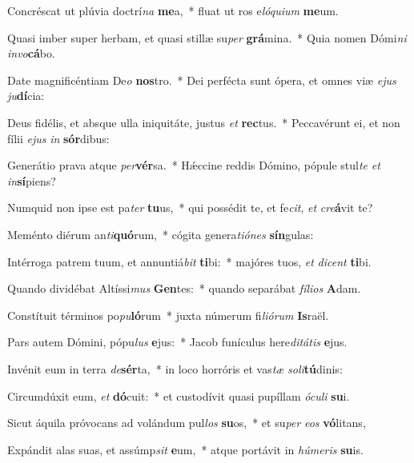\item Concréscat ut plúvia doctrí\textit{na} \textbf{me}a,~* fluat ut ros e\textit{ló}\textit{qui}\textit{um} \textbf{me}um.
\item Quasi imber super herbam, et quasi stillæ su\textit{per} \textbf{grá}mina.~* Quia nomen Dómi\textit{ni} \textit{in}\textit{vo}\textbf{cá}bo.
\item Date magnificéntiam De\textit{o} \textbf{nos}tro.~* Dei perfécta sunt ópera, et omnes viæ \textit{e}\textit{jus} \textit{ju}\textbf{dí}cia:
\item Deus fidélis, et absque ulla iniquitáte, justus \textit{et} \textbf{rec}tus.~* Peccavérunt ei, et non fílii \textit{e}\textit{jus} \textit{in} \textbf{sór}dibus:
\item Generátio prava atque \textit{per}\textbf{vér}sa.~* Hǽccine reddis Dómino, pópule stul\textit{te} \textit{et} \textit{in}\textbf{sí}piens?
\item Numquid non ipse est pa\textit{ter} \textbf{tu}us,~* qui possédit te, et fe\textit{cit}, \textit{et} \textit{cre}\textbf{á}vit te?
\item Meménto diérum an\textit{ti}\textbf{quó}rum,~* cógita genera\textit{ti}\textit{ó}\textit{nes} \textbf{sín}gulas:
\item Intérroga patrem tuum, et annuntiá\textit{bit} \textbf{ti}bi:~* majóres tuos, \textit{et} \textit{di}\textit{cent} \textbf{ti}bi.
\item Quando dividébat Altíssi\textit{mus} \textbf{Gen}tes:~* quando separábat \textit{fí}\textit{li}\textit{os} \textbf{A}dam.
\item Constítuit términos po\textit{pu}\textbf{ló}rum~* juxta númerum fi\textit{li}\textit{ó}\textit{rum} \textbf{Is}raël.
\item Pars autem Dómini, pópu\textit{lus} \textbf{e}jus:~* Jacob funículus here\textit{di}\textit{tá}\textit{tis} \textbf{e}jus.
\item Invénit eum in terra \textit{de}\textbf{sér}ta,~* in loco horróris et vas\textit{tæ} \textit{so}\textit{li}\textbf{tú}dinis:
\item Circumdúxit eum, \textit{et} \textbf{dó}cuit:~* et custodívit quasi pupíllam \textit{ó}\textit{cu}\textit{li} \textbf{su}i.
\item Sicut áquila próvocans ad volándum pul\textit{los} \textbf{su}os,~* et su\textit{per} \textit{e}\textit{os} \textbf{vó}litans,
\item Expándit alas suas, et assúmp\textit{sit} \textbf{e}um,~* atque portávit in \textit{hú}\textit{me}\textit{ris} \textbf{su}is.
